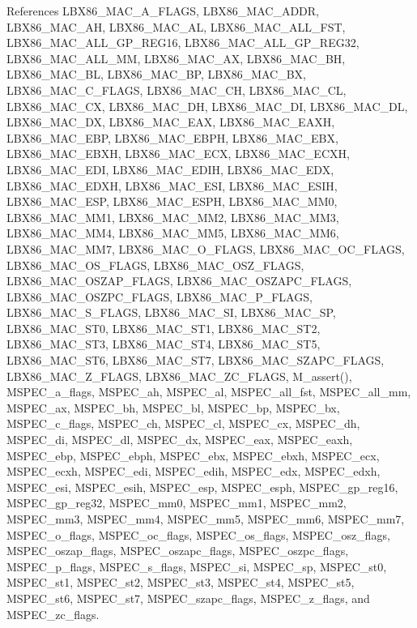 References LBX86\_\-MAC\_\-A\_\-FLAGS, LBX86\_\-MAC\_\-ADDR, LBX86\_\-MAC\_\-AH, LBX86\_\-MAC\_\-AL, LBX86\_\-MAC\_\-ALL\_\-FST, LBX86\_\-MAC\_\-ALL\_\-GP\_\-REG16, LBX86\_\-MAC\_\-ALL\_\-GP\_\-REG32, LBX86\_\-MAC\_\-ALL\_\-MM, LBX86\_\-MAC\_\-AX, LBX86\_\-MAC\_\-BH, LBX86\_\-MAC\_\-BL, LBX86\_\-MAC\_\-BP, LBX86\_\-MAC\_\-BX, LBX86\_\-MAC\_\-C\_\-FLAGS, LBX86\_\-MAC\_\-CH, LBX86\_\-MAC\_\-CL, LBX86\_\-MAC\_\-CX, LBX86\_\-MAC\_\-DH, LBX86\_\-MAC\_\-DI, LBX86\_\-MAC\_\-DL, LBX86\_\-MAC\_\-DX, LBX86\_\-MAC\_\-EAX, LBX86\_\-MAC\_\-EAXH, LBX86\_\-MAC\_\-EBP, LBX86\_\-MAC\_\-EBPH, LBX86\_\-MAC\_\-EBX, LBX86\_\-MAC\_\-EBXH, LBX86\_\-MAC\_\-ECX, LBX86\_\-MAC\_\-ECXH, LBX86\_\-MAC\_\-EDI, LBX86\_\-MAC\_\-EDIH, LBX86\_\-MAC\_\-EDX, LBX86\_\-MAC\_\-EDXH, LBX86\_\-MAC\_\-ESI, LBX86\_\-MAC\_\-ESIH, LBX86\_\-MAC\_\-ESP, LBX86\_\-MAC\_\-ESPH, LBX86\_\-MAC\_\-MM0, LBX86\_\-MAC\_\-MM1, LBX86\_\-MAC\_\-MM2, LBX86\_\-MAC\_\-MM3, LBX86\_\-MAC\_\-MM4, LBX86\_\-MAC\_\-MM5, LBX86\_\-MAC\_\-MM6, LBX86\_\-MAC\_\-MM7, LBX86\_\-MAC\_\-O\_\-FLAGS, LBX86\_\-MAC\_\-OC\_\-FLAGS, LBX86\_\-MAC\_\-OS\_\-FLAGS, LBX86\_\-MAC\_\-OSZ\_\-FLAGS, LBX86\_\-MAC\_\-OSZAP\_\-FLAGS, LBX86\_\-MAC\_\-OSZAPC\_\-FLAGS, LBX86\_\-MAC\_\-OSZPC\_\-FLAGS, LBX86\_\-MAC\_\-P\_\-FLAGS, LBX86\_\-MAC\_\-S\_\-FLAGS, LBX86\_\-MAC\_\-SI, LBX86\_\-MAC\_\-SP, LBX86\_\-MAC\_\-ST0, LBX86\_\-MAC\_\-ST1, LBX86\_\-MAC\_\-ST2, LBX86\_\-MAC\_\-ST3, LBX86\_\-MAC\_\-ST4, LBX86\_\-MAC\_\-ST5, LBX86\_\-MAC\_\-ST6, LBX86\_\-MAC\_\-ST7, LBX86\_\-MAC\_\-SZAPC\_\-FLAGS, LBX86\_\-MAC\_\-Z\_\-FLAGS, LBX86\_\-MAC\_\-ZC\_\-FLAGS, M\_\-assert(), MSPEC\_\-a\_\-flags, MSPEC\_\-ah, MSPEC\_\-al, MSPEC\_\-all\_\-fst, MSPEC\_\-all\_\-mm, MSPEC\_\-ax, MSPEC\_\-bh, MSPEC\_\-bl, MSPEC\_\-bp, MSPEC\_\-bx, MSPEC\_\-c\_\-flags, MSPEC\_\-ch, MSPEC\_\-cl, MSPEC\_\-cx, MSPEC\_\-dh, MSPEC\_\-di, MSPEC\_\-dl, MSPEC\_\-dx, MSPEC\_\-eax, MSPEC\_\-eaxh, MSPEC\_\-ebp, MSPEC\_\-ebph, MSPEC\_\-ebx, MSPEC\_\-ebxh, MSPEC\_\-ecx, MSPEC\_\-ecxh, MSPEC\_\-edi, MSPEC\_\-edih, MSPEC\_\-edx, MSPEC\_\-edxh, MSPEC\_\-esi, MSPEC\_\-esih, MSPEC\_\-esp, MSPEC\_\-esph, MSPEC\_\-gp\_\-reg16, MSPEC\_\-gp\_\-reg32, MSPEC\_\-mm0, MSPEC\_\-mm1, MSPEC\_\-mm2, MSPEC\_\-mm3, MSPEC\_\-mm4, MSPEC\_\-mm5, MSPEC\_\-mm6, MSPEC\_\-mm7, MSPEC\_\-o\_\-flags, MSPEC\_\-oc\_\-flags, MSPEC\_\-os\_\-flags, MSPEC\_\-osz\_\-flags, MSPEC\_\-oszap\_\-flags, MSPEC\_\-oszapc\_\-flags, MSPEC\_\-oszpc\_\-flags, MSPEC\_\-p\_\-flags, MSPEC\_\-s\_\-flags, MSPEC\_\-si, MSPEC\_\-sp, MSPEC\_\-st0, MSPEC\_\-st1, MSPEC\_\-st2, MSPEC\_\-st3, MSPEC\_\-st4, MSPEC\_\-st5, MSPEC\_\-st6, MSPEC\_\-st7, MSPEC\_\-szapc\_\-flags, MSPEC\_\-z\_\-flags, and MSPEC\_\-zc\_\-flags.

